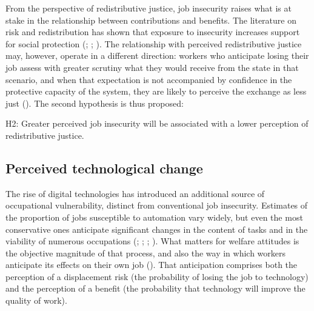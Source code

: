 \documentclass[
  12pt,
]{article}
\begin{document}
From the perspective of redistributive justice, job insecurity raises
what is at stake in the relationship between contributions and benefits.
The literature on risk and redistribution has shown that exposure to
insecurity increases support for social protection
(;
;
). The relationship with
perceived redistributive justice may, however, operate in a different
direction: workers who anticipate losing their job assess with greater
scrutiny what they would receive from the state in that scenario, and
when that expectation is not accompanied by confidence in the protective
capacity of the system, they are likely to perceive the exchange as less
just (). The second
hypothesis is thus proposed:

\begin{tcolorbox}[enhanced jigsaw, arc=.35mm, bottomrule=.15mm, breakable, colback=white, colframe=quarto-callout-color-frame, left=2mm, leftrule=.75mm, opacityback=0, rightrule=.15mm, toprule=.15mm]

H2: Greater perceived job insecurity will be associated with a lower
perception of redistributive justice.

\end{tcolorbox}

\subsection{Perceived technological
change}\label{perceived-technological-change}

The rise of digital technologies has introduced an additional source of
occupational vulnerability, distinct from conventional job insecurity.
Estimates of the proportion of jobs susceptible to automation vary
widely, but even the most conservative ones anticipate significant
changes in the content of tasks and in the viability of numerous
occupations (;
;
;
). What matters
for welfare attitudes is the objective magnitude of that process, and
also the way in which workers anticipate its effects on their own job
(). That
anticipation comprises both the perception of a displacement risk (the
probability of losing the job to technology) and the perception of a
benefit (the probability that technology will improve the quality of
work).
\end{document}
